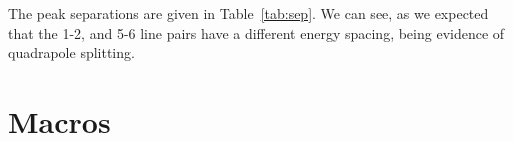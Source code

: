 \documentclass[paper=a4, fontsize=11pt, abstract=on]{scrartcl} %
\numberwithin{equation}{section}
\numberwithin{figure}{section}
\numberwithin{table}{section}
\begin{document}
The peak separations are given in
Table~\ref{tab:sep}. We can see, as we expected that the 1-2, and
5-6 line pairs have a different energy spacing, being evidence of
quadrapole splitting. 

\appendix

\section{Macros}
\label{sec:macros}




\end{document}
